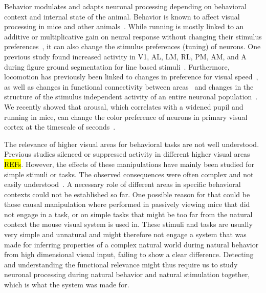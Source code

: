 \documentclass[B2,COG]{ercgrant}
\begin{document}
Behavior modulates and adapts neuronal processing depending on behavioral context and internal state of the animal.
Behavior is known to affect visual processing in mice and other animals~\parencite{Niell2010-bs, Musall2019-kd, Erisken2014-un,Christensen2017-bx}. 
While running is mostly linked to an additive or multiplicative gain on neural response without changing their stimulus preferences~\parencite{Dadarlat2017-jw, Mineault2016-fk}, it can also change the stimulus preferences (tuning) of neurons. 
One previous study found increased activity in V1, AL, LM, RL, PM, AM, and A during figure ground segmentation for line based stimuli~\parencite{Schnabel2018-tb}.
Furthermore, locomotion has previously been linked to changes in preference for visual speed~\parencite{Andermann2011-vw}, as well as changes in functional connectivity between areas~\parencite{Clancy2019-ta} and changes in the structure of the stimulus independent activity of an entire neuronal population~\parencite{Horrocks2021-re,Stringer2019-lt}. 
We recently showed that arousal, which correlates with a widened pupil and running in mice, can change the color preference of neurons in primary visual cortex at the timescale of seconds~\parencite{Franke2022-do}. 

The relevance of higher visual areas for behavioral tasks are not well understood.
Previous studies silenced or suppressed activity in different higher visual areas \hl{REFs}. 
However, the effects of these manipulations have mainly been studied for simple stimuli or tasks. 
The observed consequences were often complex and not easily understood~\parencite{Froudarakis2019-yt}. 
A necessary role of different areas in specific behavioral contexts could not be established so far. 
One possible reason for that could be those causal manipulation where performed in passively viewing mice that did not engage in a task, or on simple tasks that might be too far from the natural context the mouse visual system is used in. 
These stimuli and tasks are usually very simple and unnatural and might therefore not engage a system that was made for inferring properties of a complex natural world during natural behavior from high dimensional visual input, failing to show a clear difference.
Detecting and understanding the functional relevance might thus require us to study neuronal processing during natural behavior and natural stimulation together, which is what the system was made for. 
\end{document}

